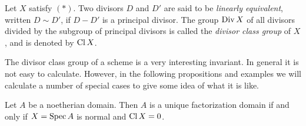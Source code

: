 \begin{definition}
Let $X$ satisfy $(*)$. Two divisors $D$ and $D'$ are said to be
\emph{linearly equivalent}, written $D \sim D'$, if $D - D'$ is a principal
divisor. The group $\operatorname{Div} X$ of all divisors divided by the subgroup of
principal divisors is called the \emph{divisor class group} of $X$, and is
denoted by $\operatorname{Cl} X$.
\end{definition}

The divisor class group of a scheme is a very interesting invariant. In
general it is not easy to calculate. However, in the following propositions
and examples we will calculate a number of special cases to give some idea of
what it is like.

\begin{proposition}[6.2]
Let $A$ be a noetherian domain. Then $A$ is a unique factorization domain if
and only if $X = \operatorname{Spec} A$ is normal and $\operatorname{Cl} X = 0$.
\end{proposition}
